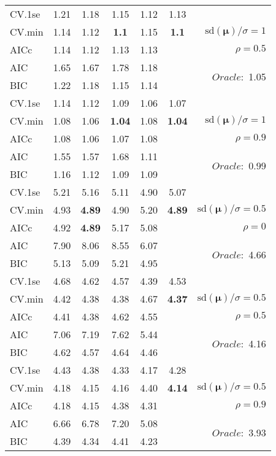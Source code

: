\begin{table}
\begin{center}
\begin{tabular}{l*{5}{c}|r}
 \hline 
CV.1se & 1.21 & 1.18 & 1.15 & 1.12 & 1.13 & \\
CV.min & 1.14 & 1.12 & {\bf 1.1} & 1.15 & {\bf 1.1} &  $\mathrm{sd}(\mathbf{\mu})/\sigma=1$ \\
AICc & 1.14 & 1.12 & 1.13 & 1.13 & & $\rho=0.5$ \\
AIC & 1.65 & 1.67 & 1.78 & 1.18 & &  \multirow{2}{*}{$Oracle: $ 1.05} \\
BIC & 1.22 & 1.18 & 1.15 & 1.14 & &  \\
 \hline 
CV.1se & 1.14 & 1.12 & 1.09 & 1.06 & 1.07 & \\
CV.min & 1.08 & 1.06 & {\bf 1.04} & 1.08 & {\bf 1.04} &  $\mathrm{sd}(\mathbf{\mu})/\sigma=1$ \\
AICc & 1.08 & 1.06 & 1.07 & 1.08 & & $\rho=0.9$ \\
AIC & 1.55 & 1.57 & 1.68 & 1.11 & &  \multirow{2}{*}{$Oracle: $ 0.99} \\
BIC & 1.16 & 1.12 & 1.09 & 1.09 & &  \\
 \hline 
CV.1se & 5.21 & 5.16 & 5.11 & 4.90 & 5.07 & \\
CV.min & 4.93 & {\bf 4.89} & 4.90 & 5.20 & {\bf 4.89} &  $\mathrm{sd}(\mathbf{\mu})/\sigma=0.5$ \\
AICc & 4.92 & {\bf 4.89} & 5.17 & 5.08 & & $\rho=0$ \\
AIC & 7.90 & 8.06 & 8.55 & 6.07 & &  \multirow{2}{*}{$Oracle: $ 4.66} \\
BIC & 5.13 & 5.09 & 5.21 & 4.95 & &  \\
 \hline 
CV.1se & 4.68 & 4.62 & 4.57 & 4.39 & 4.53 & \\
CV.min & 4.42 & 4.38 & 4.38 & 4.67 & {\bf 4.37} &  $\mathrm{sd}(\mathbf{\mu})/\sigma=0.5$ \\
AICc & 4.41 & 4.38 & 4.62 & 4.55 & & $\rho=0.5$ \\
AIC & 7.06 & 7.19 & 7.62 & 5.44 & &  \multirow{2}{*}{$Oracle: $ 4.16} \\
BIC & 4.62 & 4.57 & 4.64 & 4.46 & &  \\
 \hline 
CV.1se & 4.43 & 4.38 & 4.33 & 4.17 & 4.28 & \\
CV.min & 4.18 & 4.15 & 4.16 & 4.40 & {\bf 4.14} &  $\mathrm{sd}(\mathbf{\mu})/\sigma=0.5$ \\
AICc & 4.18 & 4.15 & 4.38 & 4.31 & & $\rho=0.9$ \\
AIC & 6.66 & 6.78 & 7.20 & 5.08 & &  \multirow{2}{*}{$Oracle: $ 3.93} \\
BIC & 4.39 & 4.34 & 4.41 & 4.23 & &  \\
 \hline 
\end{tabular}
\end{center}
\vspace{-1cm}
\end{table}






